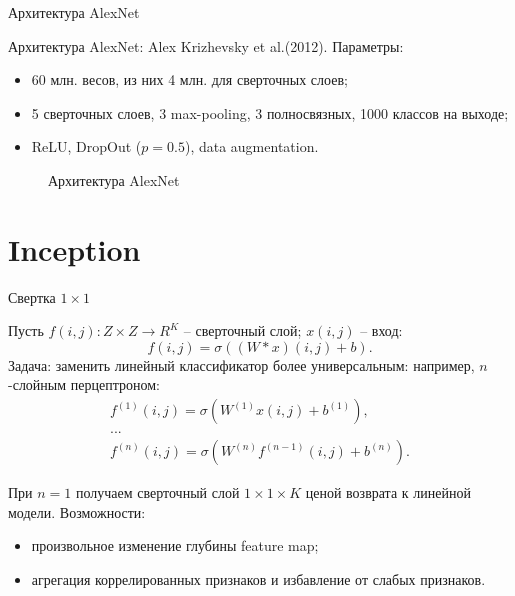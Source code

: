 \documentclass[11pt, intlimits]{beamer}
\begin{document}
\begin{frame}{Архитектура AlexNet}

Архитектура AlexNet: Alex Krizhevsky et al.(2012). Параметры:
\begin{itemize}
\item 60 млн. весов, из них 4 млн. для сверточных слоев;
\item 5 сверточных слоев, 3 max-pooling, 3 полносвязных, 1000 классов на выходе;
\item ReLU, DropOut ($p=0.5$), data augmentation.
\end{itemize}

\begin{figure}[h]
\caption{Архитектура AlexNet}
\label{img:alexnet}
\end{figure}


\end{frame}

\section{Inception}

\begin{frame}{Свертка $1 \times 1$}

Пусть $f(i,j) : Z \times Z \to R^K$ -- сверточный слой; $x(i, j)$ -- вход:
$$
f(i,j)=\sigma((W*x)(i,j) + b).
$$
Задача: заменить линейный классификатор более универсальным:
например, $n$-слойным перцептроном:
\begin{gather*}
f^{(1)}(i,j)=\sigma(W^{(1)} x(i,j) + b^{(1)}), \\
... \\
f^{(n)}(i,j)=\sigma(W^{(n)} f^{(n-1)}(i,j) + b^{(n)}).
\end{gather*}

При $n=1$ получаем сверточный слой $1 \times 1 \times K$ ценой возврата к линейной модели. Возможности:
\begin{itemize}
\item произвольное изменение глубины feature map;
\item агрегация коррелированных признаков и избавление от слабых признаков.
\end{itemize}

\end{frame}
\end{document}
